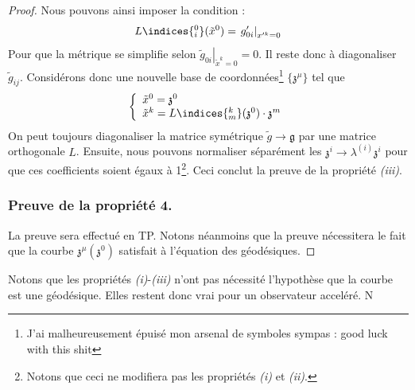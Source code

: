 \begin{proof}
    Nous pouvons ainsi imposer la condition :
    \begin{equation}
        L\indices{^0_i}(\tilde{x}^0) = \left. g'_{0i} \right|_{x'^k = 0}
    \end{equation}
    Pour que la métrique se simplifie selon $\left. \tilde{g}_{0i} \right|_{\tilde{x}^k = 0} = 0$. Il reste donc à diagonaliser $\tilde{g}_{ij}$. Considérons donc une nouvelle base de coordonnées\footnote{J'ai malheureusement épuisé mon arsenal de symboles sympas : good luck with this shit} $\{\mathfrak{z}^\mu \}$ tel que
    \begin{equation}
        \left\{
        \begin{array}{l}
            \tilde{x}^0 = \mathfrak{z}^0\\
            \tilde{x}^k = L\indices{^k_m}(\mathfrak{z}^0) \cdot \mathfrak{z}^m
        \end{array}
        \right.
    \end{equation}
    On peut toujours diagonaliser la matrice symétrique $\tilde{g} \to \mathfrak{g}$ par une matrice orthogonale $L$. Ensuite, nous pouvons normaliser séparément les $\mathfrak{z}^i \to \lambda^{(i)} \mathfrak{z}^i $ pour que ces coefficients soient égaux à 1\footnote{Notons que ceci ne modifiera pas les propriétés \emph{(i)} et \emph{(ii)}.}. Ceci conclut la preuve de la propriété \emph{(iii)}. 
\subsubsection{Preuve de la propriété 4.}
La preuve sera effectué en TP. Notons néanmoins que la preuve nécessitera le fait que la courbe $\mathfrak{z}^\mu(\mathfrak{z}^0)$ satisfait à l'équation des géodésiques.
\end{proof}
Notons que les propriétés \emph{(i)}-\emph{(iii)} n'ont pas nécessité l'hypothèse que la courbe est une géodésique. Elles restent donc vrai pour un observateur acceléré. N
